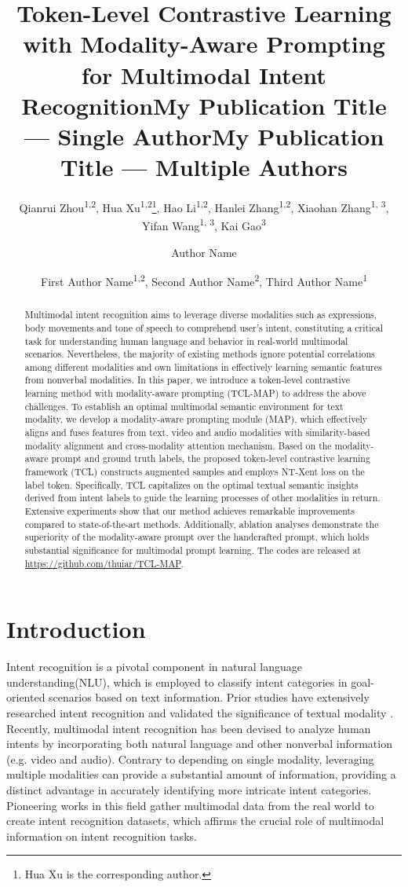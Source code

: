 \documentclass[letterpaper]{article} %
\title{Token-Level Contrastive Learning with Modality-Aware Prompting for Multimodal Intent Recognition}
\author{
    Qianrui Zhou\textsuperscript{\rm 1,\rm 2},
    Hua Xu\textsuperscript{\rm 1,\rm 2}\footnote{Hua Xu is the corresponding author.},
    Hao Li\textsuperscript{\rm 1,\rm 2},
    Hanlei Zhang\textsuperscript{\rm 1,\rm 2},
    Xiaohan Zhang\textsuperscript{\rm 1, \rm 3},
    Yifan Wang\textsuperscript{\rm 1, \rm 3},
    Kai Gao\textsuperscript{\rm 3}
}
\title{My Publication Title --- Single Author}
\author {
    Author Name
}
\title{My Publication Title --- Multiple Authors}
\author {
    First Author Name\textsuperscript{\rm 1,\rm 2},
    Second Author Name\textsuperscript{\rm 2},
    Third Author Name\textsuperscript{\rm 1}
}
\begin{document}
\maketitle

\begin{abstract}
Multimodal intent recognition aims to leverage diverse modalities such as expressions, body movements and tone of speech to comprehend user's intent, constituting a critical task for understanding human language and behavior in real-world multimodal scenarios. Nevertheless, the majority of existing methods ignore potential correlations among different modalities and own limitations in effectively learning semantic features from nonverbal modalities. In this paper, we introduce a token-level contrastive learning method with modality-aware prompting (TCL-MAP) to address the above challenges. To establish an optimal multimodal semantic environment for text modality, we develop a modality-aware prompting module (MAP), which effectively aligns and fuses features from text, video and audio modalities with similarity-based modality alignment and cross-modality attention mechanism. Based on the modality-aware prompt and ground truth labels, the proposed token-level contrastive learning framework (TCL) constructs augmented samples and employs NT-Xent loss on the label token. Specifically, TCL capitalizes on the optimal textual semantic insights derived from intent labels to guide the learning processes of other modalities in return. Extensive experiments show that our method achieves remarkable improvements compared to state-of-the-art methods. Additionally, ablation analyses demonstrate the superiority of the modality-aware prompt over the handcrafted prompt, which holds substantial significance for multimodal prompt learning. The codes are released at \url{https://github.com/thuiar/TCL-MAP}.

\end{abstract}

\section{Introduction}

Intent recognition is a pivotal component in natural language understanding(NLU), which is employed to classify intent categories in goal-oriented scenarios based on text information. Prior studies have extensively researched intent recognition and validated the significance of textual modality \cite{zhang2021textoir, zhang2021discovering}. Recently, multimodal intent recognition has been devised to analyze human intents by incorporating both natural language and other nonverbal information (e.g. video and audio). Contrary to depending on single modality, leveraging multiple modalities can provide a substantial amount of information, providing a distinct advantage in accurately identifying more intricate intent categories. Pioneering works in this field \cite{10.1145/3503161.3547906, saha-etal-2020-towards} gather multimodal data from the real world to create intent recognition datasets, which affirms the crucial role of multimodal information on intent recognition tasks.
\end{document}
